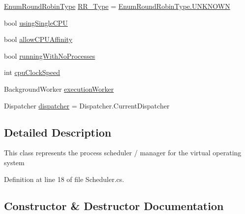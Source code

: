 \begin{DoxyCompactItemize}
\item 
\hyperlink{namespace_c_p_u___o_s___simulator_1_1_operating___system_a4c7effb8b6725df52018a3a14cede96e}{Enum\+Round\+Robin\+Type} \hyperlink{class_c_p_u___o_s___simulator_1_1_operating___system_1_1_scheduler_afa5f282549e500f0444d12048bdc31c9}{R\+R\+\_\+\+Type} = \hyperlink{namespace_c_p_u___o_s___simulator_1_1_operating___system_aea0b669d1bbf5690ae34ac2f8bef9470a696b031073e74bf2cb98e5ef201d4aa3}{Enum\+Round\+Robin\+Type.\+U\+N\+K\+N\+O\+W\+N}
\item 
bool \hyperlink{class_c_p_u___o_s___simulator_1_1_operating___system_1_1_scheduler_acd5c163fd74bd9e7ad4cbeb7f55c0338}{using\+Single\+C\+P\+U}
\item 
bool \hyperlink{class_c_p_u___o_s___simulator_1_1_operating___system_1_1_scheduler_a732d4b0d95cad3e280f9b69dd4f9f7c4}{allow\+C\+P\+U\+Affinity}
\item 
bool \hyperlink{class_c_p_u___o_s___simulator_1_1_operating___system_1_1_scheduler_af3276e8686d9efa7f8da6e48257922e3}{running\+With\+No\+Processes}
\item 
int \hyperlink{class_c_p_u___o_s___simulator_1_1_operating___system_1_1_scheduler_ae1829f5340f76cad2150c9e1f9ab3c69}{cpu\+Clock\+Speed}
\item 
Background\+Worker \hyperlink{class_c_p_u___o_s___simulator_1_1_operating___system_1_1_scheduler_a8b68cea278d24fcc12c6721210fe8dcb}{execution\+Worker}
\item 
Dispatcher \hyperlink{class_c_p_u___o_s___simulator_1_1_operating___system_1_1_scheduler_ab29898ad206dbc3a62234321cefe73ee}{dispatcher} = Dispatcher.\+Current\+Dispatcher
\end{DoxyCompactItemize}


\subsection{Detailed Description}
This class represents the process scheduler / manager for the virtual operating system 



Definition at line 18 of file Scheduler.\+cs.



\subsection{Constructor \& Destructor Documentation}
\hypertarget{class_c_p_u___o_s___simulator_1_1_operating___system_1_1_scheduler_a5911adf7a88d4bc66f0de915bb925461}{}
